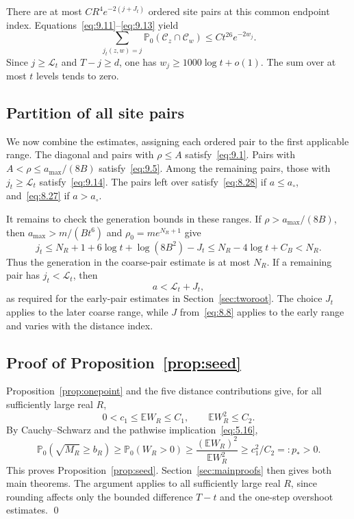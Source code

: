 \documentclass[11pt,a4paper]{article}
\numberwithin{equation}{section}
\theoremstyle{remark}
\begin{document}
There are at most $CR^4e^{-2(j+J_t)}$ ordered site pairs at this common endpoint index. Equations~\eqref{eq:9.11}--\eqref{eq:9.13} yield
\begin{equation}\label{eq:9.14}
\sum_{j_t(z,w)=j}\mathbb P_0(\mathcal C_z\cap\mathcal C_w)
\le Ct^{26}e^{-2w_j}.
\end{equation}
Since $j\ge\mathcal L_t$ and $T-j\ge d$, one has
$w_j\ge1000\log t+o(1)$. The sum over at most $t$ levels tends to zero.

\subsection{Partition of all site pairs}\label{sec:partition}
We now combine the estimates, assigning each ordered pair to the first applicable range. The diagonal and pairs with $\rho\le A$ satisfy~\eqref{eq:9.1}. Pairs with $A<\rho\le a_{\max}/(8B)$ satisfy~\eqref{eq:9.5}. Among the remaining pairs, those with $j_t\ge\mathcal L_t$ satisfy~\eqref{eq:9.14}. The pairs left over satisfy~\eqref{eq:8.28} if $a\le a_\circ$, and~\eqref{eq:8.27} if $a>a_\circ$.

It remains to check the generation bounds in these ranges. If $\rho>a_{\max}/(8B)$, then $a_{\max}>m/(Bt^6)$ and $\rho_0=me^{N_R+1}$ give
\begin{equation}\label{eq:9.15}
j_t\le N_R+1+6\log t+\log(8B^2)-J_t
\le N_R-4\log t+C_B<N_R.
\end{equation}
Thus the generation in the coarse-pair estimate is at most $N_R$. If a remaining pair has $j_t<\mathcal L_t$, then
\begin{equation}\label{eq:9.16}
a<\mathcal L_t+J_t,
\end{equation}
as required for the early-pair estimates in Section~\ref{sec:tworoot}. The choice $J_t$ applies to the later coarse range, while $J$ from~\eqref{eq:8.8} applies to the early range and varies with the distance index.

\subsection{Proof of Proposition~\ref{prop:seed}}\label{sec:seedcompletion}
Proposition~\ref{prop:onepoint} and the five distance contributions give, for all sufficiently large real $R$,
\begin{equation}\label{eq:9.17}
0<c_1\le\mathbb EW_R\le C_1,\qquad
\mathbb EW_R^2\le C_2.
\end{equation}
By Cauchy--Schwarz and the pathwise implication~\eqref{eq:5.16},
\begin{equation}\label{eq:9.18}
\mathbb P_0(\sqrt{M_R}\ge b_R)
\ge\mathbb P_0(W_R>0)
\ge\frac{(\mathbb EW_R)^2}{\mathbb EW_R^2}
\ge c_1^2/C_2=:p_*>0.
\end{equation}
This proves Proposition~\ref{prop:seed}. Section~\ref{sec:mainproofs} then gives both main theorems. The argument applies to all sufficiently large real $R$, since rounding affects only the bounded difference $T-t$ and the one-step overshoot estimates.
\qed
\end{document}
